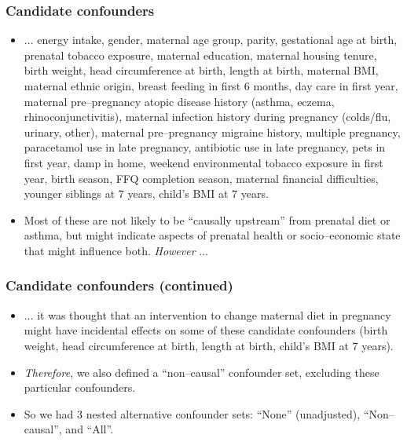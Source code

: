 \documentclass[11pt]{beamer}
\begin{document}
\begin{frame}
\frametitle{Candidate confounders}

\begin{itemize}

\item<2-> $\ldots$ energy intake, gender, maternal age group, parity, gestational age at birth, prenatal tobacco exposure,
maternal education, maternal housing tenure,
birth weight, head circumference at birth, length at birth,
maternal BMI, maternal ethnic origin, breast feeding in first 6 months, day care in first year,
maternal pre--pregnancy atopic disease history (asthma, eczema, rhinoconjunctivitis),
maternal infection history during pregnancy (colds/flu, urinary, other),
maternal pre--pregnancy migraine history, multiple pregnancy,
paracetamol use in late pregnancy, antibiotic use in late pregnancy, pets in first year, damp in home,
weekend environmental tobacco exposure in first year,
birth season, FFQ completion season, maternal financial difficulties,
younger siblings at 7 years, child's BMI at 7 years.

\item<3-> Most of these are not likely to be ``causally upstream'' from prenatal diet or asthma,
but might indicate aspects of prenatal health or socio--economic state that might influence both.
\textit{However} $\ldots$

\end{itemize}

\end{frame}

\begin{frame}
\frametitle{Candidate confounders (continued)}

\begin{itemize}

\item<2-> $\ldots$ it was thought that an intervention to change maternal diet in pregnancy
might have incidental effects on some of these candidate confounders
(birth weight, head circumference at birth, length at birth,
child's BMI at 7 years).

\item<3-> \textit{Therefore}, we also defined a ``non--causal'' confounder set,
excluding these particular confounders.

\item<4-> So we had 3 nested alternative confounder sets:  ``None'' (unadjusted),  ``Non--causal'', and ``All''.

\end{itemize}

\end{frame}
\end{document}
